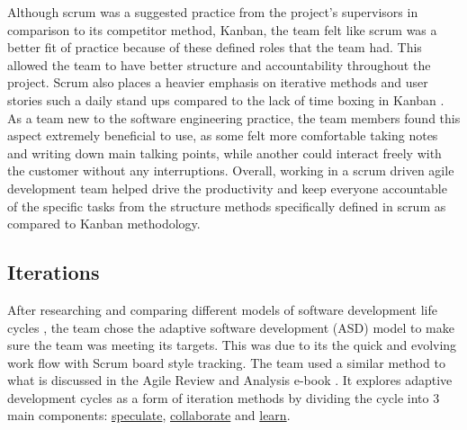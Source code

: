 \documentclass{l3proj}
\begin{document}
Although scrum was a suggested practice from the project's supervisors in comparison to its competitor method, Kanban, the team felt like scrum was a better fit of practice because of these defined roles that the team had. This allowed the team to have better structure and accountability throughout the project. Scrum also places a heavier emphasis on iterative methods and user stories such a daily stand ups compared to the lack of time boxing in Kanban \cite{ScrumvsKanban}. As a team new to the software engineering practice, the team members found this aspect extremely beneficial to use, as some felt more comfortable taking notes and writing down main talking points, while another could interact freely with the customer without any interruptions. Overall, working in a scrum driven agile development team helped drive the productivity and keep everyone accountable of the specific tasks from the structure methods specifically defined in scrum as compared to Kanban methodology.



\subsection{Iterations}
\label{subsec:iterations}
After researching and comparing different models of software development life cycles \cite{SDLC}, the team chose the adaptive software development (ASD) model to make sure the team was meeting its targets. This was due to its the quick and evolving work flow with Scrum board style tracking. The team used a similar method to what is discussed in the Agile Review and Analysis e-book \cite{IterationReviewAndAnalysis}. It explores adaptive development cycles as a form of iteration methods by dividing the cycle into 3 main components: \hyperref[speculate]{speculate}, \hyperref[collab]{collaborate} and \hyperref[learn]{learn}. 
\end{document}
